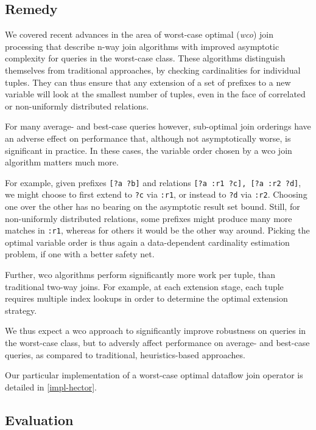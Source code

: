\documentclass[../catalog.tex]{subfiles}
\begin{document}
\subsection{Remedy}

We covered recent advances in the area of worst-case optimal
(\emph{wco}) join processing that describe n-way join algorithms with
improved asymptotic complexity for queries in the worst-case
class. These algorithms distinguish themselves from traditional
approaches, by checking cardinalities for individual tuples. They can
thus ensure that any extension of a set of prefixes to a new variable
will look at the smallest number of tuples, even in the face of
correlated or non-uniformly distributed relations.

For many average- and best-case queries however, sub-optimal join
orderings have an adverse effect on performance that, although not
asymptotically worse, is significant in practice. In these cases, the
variable order chosen by a wco join algorithm matters much more.

For example, given prefixes \texttt{[?a ?b]} and relations \texttt{[?a
    :r1 ?c], [?a :r2 ?d]}, we might choose to first extend to
\texttt{?c} via \texttt{:r1}, or instead to \texttt{?d} via
\texttt{:r2}. Choosing one over the other has no bearing on the
asymptotic result set bound. Still, for non-uniformly distributed
relations, some prefixes might produce many more matches in
\texttt{:r1}, whereas for others it would be the other way
around. Picking the optimal variable order is thus again a
data-dependent cardinality estimation problem, if one with a better
safety net.

Further, wco algorithms perform significantly more work per tuple,
than traditional two-way joins. For example, at each extension stage,
each tuple requires multiple index lookups in order to determine the
optimal extension strategy.

We thus expect a wco approach to significantly improve robustness on
queries in the worst-case class, but to adversly affect performance on
average- and best-case queries, as compared to traditional,
heuristics-based approaches.

Our particular implementation of a worst-case optimal dataflow join
operator is detailed in \autoref{impl-hector}.

\subsection{Evaluation}
\end{document}
